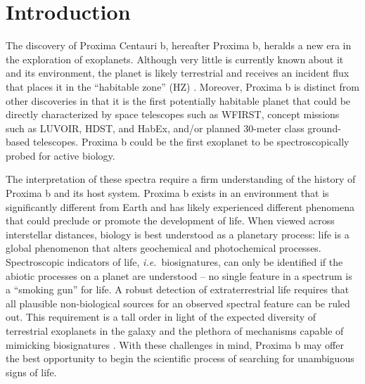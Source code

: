 \documentclass[preprint,12pt]{aastex}
\def\ie{{\it i.e.\ }}
\begin{document}
\section{Introduction\label{sec:intro}}

The discovery of Proxima Centauri b, hereafter Proxima b, heralds a
new era in the exploration of exoplanets. Although very little is
currently known about it and its environment, the planet is likely
terrestrial and receives an incident flux that places it in the
``habitable zone'' (HZ)
\citep{Kasting93,Selsis07,Kopparapu13}. Moreover, Proxima b is
distinct from other discoveries in that it is the first potentially
habitable planet that could be directly characterized by space
telescopes such as WFIRST, concept missions such as LUVOIR, HDST, and
HabEx, and/or planned 30-meter class ground-based telescopes. Proxima
b could be the first exoplanet to be spectroscopically probed for
active biology.

The interpretation of these spectra require a firm understanding of
the history of Proxima b and its host system. Proxima b exists in an
environment that is significantly different from Earth and has likely
experienced different phenomena that could preclude or promote the
development of life. When viewed across interstellar distances,
biology is best understood as a planetary process: life is a global
phenomenon that alters geochemical and photochemical
processes. Spectroscopic indicators of life, \ie biosignatures, can
only be identified if the abiotic processes on a planet are understood
-- no single feature in a spectrum is a ``smoking gun'' for life. A
robust detection of extraterrestrial life requires that all plausible
non-biological sources for an observed spectral feature can be ruled
out. This requirement is a tall order in light of the expected
diversity of terrestrial exoplanets in the galaxy and the plethora of
mechanisms capable of mimicking biosignatures
\citep{Schwieterman16,Meadows16}.  With these challenges in mind,
Proxima b may offer the best opportunity to begin the scientific
process of searching for unambiguous signs of life.
\end{document}
